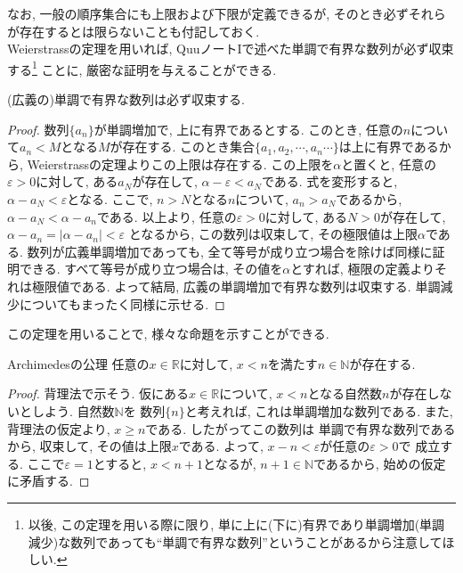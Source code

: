 \documentclass[a4j,dvipdfmx]{jsarticle}
\numberwithin{equation}{section}
\begin{document}
            なお, 一般の順序集合にも上限および下限が定義できるが, そのとき必ずそれらが存在するとは限らないことも付記しておく.\\

            Weierstrassの定理を用いれば, QuuノートIで述べた単調で有界な数列が必ず収束する\footnote{以後, この定理を用いる際に限り, 単に上に(下に)有界であり単調増加(単調減少)な数列であっても``単調で有界な数列''ということがあるから注意してほしい.}
            ことに, 厳密な証明を与えることができる. 
            \begin{screen}
                (広義の)単調で有界な数列は必ず収束する.
            \end{screen}
            \begin{proof}
                数列$\{a_n\}$が単調増加で, 上に有界であるとする. このとき, 任意の$n$について$a_n<M$となる$M$が存在する.
                このとき集合$\{a_1,a_2,\cdots,a_n\cdots\}$は上に有界であるから, Weierstrassの定理よりこの上限は存在する.
                この上限を$\alpha$と置くと, 任意の$\varepsilon>0$に対して, ある$a_{N}$が存在して, $\alpha - \varepsilon < a_{N}$である.
                式を変形すると, $\alpha -a_{N}< \varepsilon$となる. ここで, $n>N$となる$n$について, $a_n>a_N$であるから, 
                $\alpha - a_{N} < \alpha - a_{n}$である. 以上より, 任意の$\varepsilon>0$に対して, ある$N>0$が存在して, $\alpha-a_{n}=|\alpha - a_{n}|<\varepsilon$
                となるから, この数列は収束して, その極限値は上限$\alpha$である. 数列が広義単調増加であっても, 全て等号が成り立つ場合を除けば同様に証明できる. 
                すべて等号が成り立つ場合は, その値を$\alpha$とすれば, 極限の定義よりそれは極限値である. 
                よって結局, 広義の単調増加で有界な数列は収束する. 単調減少についてもまったく同様に示せる.
            \end{proof}

            この定理を用いることで, 様々な命題を示すことができる. 
            
            \begin{itembox}{Archimedesの公理}
                任意の$x\in\mathbb{R}$に対して, $x<n$を満たす$n\in \mathbb{N}$が存在する.
            \end{itembox}
            \begin{proof}
                背理法で示そう. 仮にある$x\in\mathbb{R}$について, $x<n$となる自然数$n$が存在しないとしよう. 自然数$\mathbb{N}$を
                数列$\{n\}$と考えれば, これは単調増加な数列である. また, 背理法の仮定より, $x\geq n$である. したがってこの数列は
                単調で有界な数列であるから, 収束して, その値は上限$x$である. よって, $x-n<\varepsilon$が任意の$\varepsilon>0$で
                成立する. ここで$\varepsilon=1$とすると, $x<n+1$となるが, $n+1\in\mathbb{N}$であるから, 始めの仮定に矛盾する.
            \end{proof}
\end{document}
